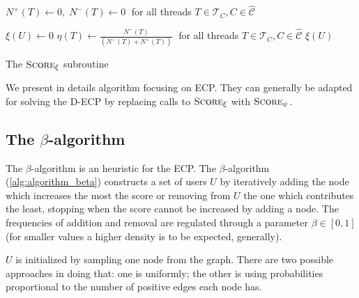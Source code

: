 \begin{algorithm}
	\SetAlgoLined
	$N^{+} (T) \leftarrow 0, \; N^{-} (T) \leftarrow 0\; $ for all threads $T
		\in \mathcal{T}_{C}, C \in \mathcal{\hat{C}}   $ \;


	$\xi(U) \leftarrow 0$ \;
	$\eta(T) \leftarrow\frac{N^{-}(T)}{(N^{-}(T) + N^{+} (T))} \; $ for all threads $T
		\in \mathcal{T}_{C}, C \in \mathcal{\hat{C}}   $  \;
	\Return $\xi(U)$ \;

	\caption{The $\textsc{Score}_{\xi}  $ subroutine}
	\label{alg:score_xi}
\end{algorithm}

We present in details algorithm focusing on \acrshort{ECP}. They can generally be
adapted for solving the \acrshort{D-ECP} by replacing calls to
$\textsc{Score}_{\xi}$ with $\textsc{Score}_{\psi}$.

\subsection{The $\beta$-algorithm}%
\label{ssub:the_beta_approach}

The $\beta$-algorithm is an heuristic for the \acrshort{ECP}. The
$\beta$-algorithm (\autoref{alg:algorithm_beta}) constructs a set of users $U$ by
iteratively adding the node which increases the most the score or removing from
$U$ the one which contributes the least, stopping when the score cannot be
increased by adding a node. The frequencies of addition and removal are regulated
through a parameter $\beta \in [0, 1]$ (for smaller values a higher density is to be expected,
generally).

$U$ is initialized by sampling one node from the graph. There are two possible
approaches in doing that: one is uniformly;
the other is using probabilities proportional to the number
of positive edges each node has.

